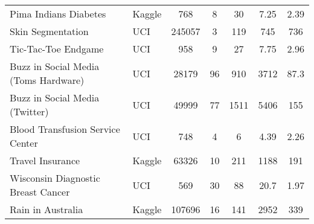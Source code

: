 \begin{sidewaystable}
{\begin{tabular}{@{}llS[table-format=6.0]S[table-format=3.0]S[table-format=4.0]S[table-format=5.2]S[table-format=3.3]@{}}
        Pima Indians Diabetes                & Kaggle &    768 &   8 &   30 &     7.25 &    2.39 \\
        Skin Segmentation                    & UCI    & 245057 &   3 &  119 &   745    &  736 \\
        Tic-Tac-Toe Endgame                  & UCI    &    958 &   9 &   27 &     7.75 &    2.96 \\
        Buzz in Social Media (Toms Hardware) & UCI    &  28179 &  96 &  910 &  3712    &   87.3 \\
        Buzz in Social Media (Twitter)       & UCI    &  49999 &  77 & 1511 &  5406    &  155 \\
        Blood Transfusion Service Center     & UCI    &    748 &   4 &    6 &     4.39 &    2.26 \\
        Travel Insurance                     & Kaggle &  63326 &  10 &  211 &  1188    &  191 \\
        Wisconsin Diagnostic Breast Cancer   & UCI    &    569 &  30 &   88 &    20.7  &    1.97 \\
        Rain in Australia                    & Kaggle & 107696 &  16 &  141 &  2952    &  339 \\
        \bottomrule
    \end{tabular}
    }
\end{sidewaystable}